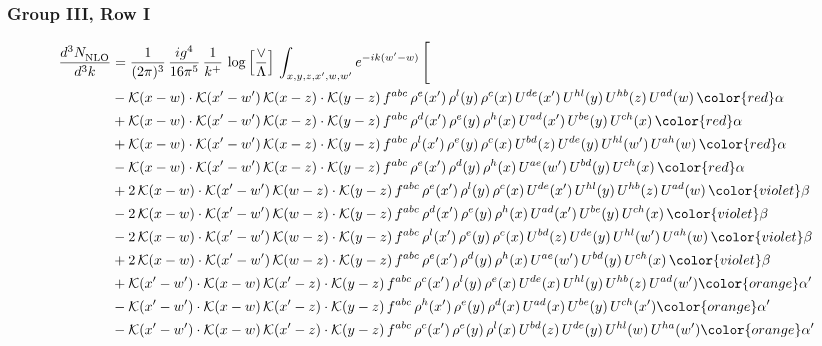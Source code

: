 \subsubsection{Group III, Row I}
\begin{align}
     \frac{d^{3}N_{\rm NLO}^{\rm}}{d^{3}k}  & = \frac{1}{(2\pi)^{3}}\, \frac{ig^{4}}{16\pi^{5}}\, \frac{1}{k^{+}}\, \log{\left[\frac{\vee}{\Lambda}\right]}\, \int_{x,y,z,x^{\prime},w,w^{\prime}}e^{-ik(w^{\prime}-w)}\, \Bigg[\notag \\ & -\mathcal{K}(x-w)\cdot \mathcal{K}(x'-w')\, \mathcal{K}(x-z)\cdot \mathcal{K}(y-z)\, f^{abc}\, \rho^{e}(x')\,\rho^{l}(y)\,\rho^{c}(x)\,U^{de}(x')\,U^{hl}(y)\,U^{hb}(z)\,U^{ad}(w)\, {\color{red}\alpha} \notag \\ & +\mathcal{K}(x-w)\cdot \mathcal{K}(x'-w')\, \mathcal{K}(x-z)\cdot \mathcal{K}(y-z)\, f^{abc}\, \rho^{d}(x')\,\rho^{e}(y)\,\rho^{h}(x)\,U^{ad}(x')\,U^{be}(y)\,U^{ch}(x)\, {\color{red}\alpha} \notag \\ & + \mathcal{K}(x-w)\cdot \mathcal{K}(x'-w')\, \mathcal{K}(x-z)\cdot \mathcal{K}(y-z)\, f^{abc}\, \rho^{l}(x')\,\rho^{e}(y)\,\rho^{c}(x)\,U^{bd}(z)\,U^{de}(y)\,U^{hl}(w')\,U^{ah}(w)\, {\color{red}\alpha} \notag \\ & -\mathcal{K}(x-w)\cdot \mathcal{K}(x'-w')\, \mathcal{K}(x-z)\cdot \mathcal{K}(y-z)\, f^{abc}\, \rho^{e}(x')\,\rho^{d}(y)\,\rho^{h}(x)\,U^{ae}(w')\,U^{bd}(y)\,U^{ch}(x)\, {\color{red}\alpha} \notag \\ & +2\, \mathcal{K}(x-w)\cdot \mathcal{K}(x'-w')\, \mathcal{K}(w-z) \cdot \mathcal{K}(y-z)\, f^{abc}\, \rho^{e}(x')\,\rho^{l}(y)\, \rho^{c}(x)\, U^{de}(x')\,U^{hl}(y)\,U^{hb}(z)\,U^{ad}(w)\, {\color{violet} \beta} \notag \\ & -2\, \mathcal{K}(x-w)\cdot \mathcal{K}(x'-w')\, \mathcal{K}(w-z) \cdot \mathcal{K}(y-z)\, f^{abc}\, \rho^{d}(x')\,\rho^{e}(y)\, \rho^{h}(x)\, U^{ad}(x')\,U^{be}(y)\,U^{ch}(x)\, {\color{violet} \beta}\notag \\ & -2\, \mathcal{K}(x-w)\cdot \mathcal{K}(x'-w')\, \mathcal{K}(w-z) \cdot \mathcal{K}(y-z)\, f^{abc}\, \rho^{l}(x')\,\rho^{e}(y)\, \rho^{c}(x)\, U^{bd}(z)\,U^{de}(y)\,U^{hl}(w')\,U^{ah}(w)\, {\color{violet} \beta}\notag \\ & + 2\, \mathcal{K}(x-w)\cdot \mathcal{K}(x'-w')\, \mathcal{K}(w-z) \cdot \mathcal{K}(y-z)\, f^{abc}\, \rho^{e}(x')\,\rho^{d}(y)\, \rho^{h}(x)\, U^{ae}(w')\,U^{bd}(y)\,U^{ch}(x)\, {\color{violet} \beta}\notag \\ & +\mathcal{K}(x'-w')\cdot\mathcal{K}(x-w)\,\mathcal{K}(x'-z)\cdot\mathcal{K}(y-z)\, f^{abc}\,\rho^{c}(x')\,\rho^{l}(y)\,\rho^{e}(x)\,U^{de}(x)\,U^{hl}(y)\,U^{hb}(z)\,U^{ad}(w'){\color{orange} \alpha'}\notag\\ &-\mathcal{K}(x'-w')\cdot\mathcal{K}(x-w)\,\mathcal{K}(x'-z)\cdot\mathcal{K}(y-z)\, f^{abc}\,\rho^{h}(x')\,\rho^{e}(y)\,\rho^{d}(x)\,U^{ad}(x)\,U^{be}(y)\,U^{ch}(x'){\color{orange} \alpha'}\notag\\ &-\mathcal{K}(x'-w')\cdot\mathcal{K}(x-w)\,\mathcal{K}(x'-z)\cdot\mathcal{K}(y-z)\, f^{abc}\,\rho^{c}(x')\,\rho^{e}(y)\,\rho^{l}(x)\,U^{bd}(z)\,U^{de}(y)\,U^{hl}(w)\,U^{ha}(w'){\color{orange} \alpha'}\notag \\ 
\end{align}
